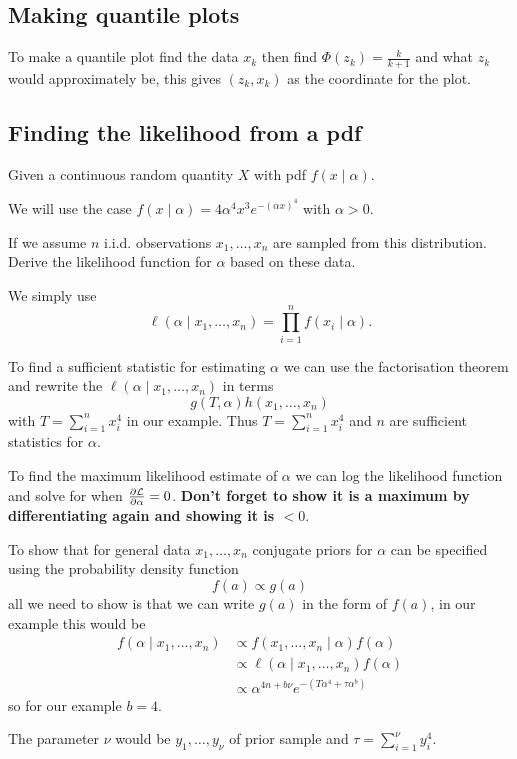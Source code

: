 \documentclass[10pt, a4paper]{article}
\begin{document}
\subsection{Making quantile plots}

To make a quantile plot find the data $x_k$ then find $\Phi(z_k) = \frac{k}{k + 1}$ and what $z_k$ would approximately be,
this gives $(z_k, x_k)$ as the coordinate for the plot.


\subsection{Finding the likelihood from a pdf}
Given a continuous random quantity $X$ with pdf $f(x\mid \alpha)$.

We will use the case $f(x\mid \alpha) = 4\alpha ^ 4x ^ 3e ^ {-(\alpha x) ^ 4}$ with $\alpha > 0$.

If we assume $n$ i.i.d. observations $x_1, \dotsc, x_n$ are sampled from this distribution.
Derive the likelihood function for $\alpha$ based on these data.

We simply use
\[
\ell(\alpha\mid x_1, \dotsc, x_n) = \prod_{i = 1}^{n}f(x_i\mid \alpha).
\]

To find a sufficient statistic for estimating $\alpha$ we can use the factorisation theorem and rewrite the $\ell(\alpha\mid x_1, \dotsc, x_n)$ in terms
\[
g(T, \alpha)h(x_1, \dotsc, x_n)
\]
with $T = \sum_{i = 1}^{n}x_i ^ 4$ in our example.
Thus $T = \sum_{i = 1}^{n}x_i ^ 4$ and $n$ are sufficient statistics for $\alpha$.

To find the maximum likelihood estimate of $\alpha$ we can log the likelihood function and solve for when $\pd[\mathcal{L}]{\alpha} = 0$.
\textbf{Don't forget to show it is a maximum by differentiating again and showing it is $< 0$}.

To show that for general data $x_1, \dotsc, x_n$ conjugate priors for $\alpha$ can be specified using the probability density function
\[
f(a) \propto g(a)
\]
all we need to show is that we can write $g(a)$ in the form of $f(a)$,
in our example this would be
\begin{align*}
    f(\alpha\mid x_1, \dotsc, x_n) &\propto f(x_1, \dotsc, x_n\mid \alpha)f(\alpha) \\
    &\propto \ell(\alpha\mid x_1, \dotsc, x_n)f(\alpha) \\
    &\propto \alpha ^ {4n + b\nu}e ^ {-(T\alpha ^ 4 + \tau\alpha ^ b)}
\end{align*}
so for our example $b = 4$.

The parameter $\nu$ would be $y_1, \dotsc, y_{\nu}$ of prior sample and $\tau = \sum_{i = 1}^{\nu}y_i ^ 4$.
\end{document}
